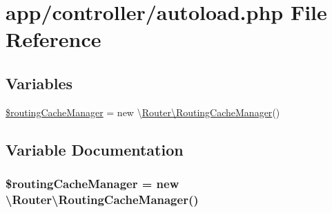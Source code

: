 \hypertarget{autoload_8php}{\section{app/controller/autoload.php File Reference}
\label{autoload_8php}
}
\subsection*{Variables}
\begin{DoxyCompactItemize}
\item 
\hyperlink{autoload_8php_a9120823e7381c4d800ffb87d86fc1955}{\$routing\-Cache\-Manager} = new \textbackslash{}\hyperlink{class_router_1_1_routing_cache_manager}{Router\textbackslash{}\-Routing\-Cache\-Manager}()
\end{DoxyCompactItemize}


\subsection{Variable Documentation}
\hypertarget{autoload_8php_a9120823e7381c4d800ffb87d86fc1955}{
\subsubsection[{\$routing\-Cache\-Manager}]{\setlength{\rightskip}{0pt plus 5cm}\$routing\-Cache\-Manager = new \textbackslash{}{\bf Router\textbackslash{}\-Routing\-Cache\-Manager}()}}\label{autoload_8php_a9120823e7381c4d800ffb87d86fc1955}

